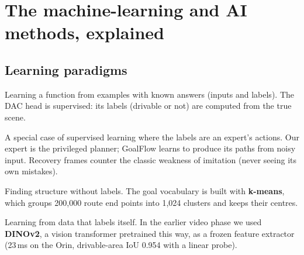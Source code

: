 \documentclass[11pt,a4paper]{article}
\begin{document}
\section{The machine-learning and AI methods, explained}
\label{sec:ml}

\subsection{Learning paradigms}
\begin{description}[style=nextline,leftmargin=0pt]
  \item[Supervised learning] Learning a function from examples with known answers (inputs and labels).
        The DAC head is supervised: its labels (drivable or not) are computed from the true scene.
  \item[Imitation learning / teacher--student] A special case of supervised learning where the labels are
        an expert's actions. Our expert is the privileged planner; GoalFlow learns to produce its paths from
        noisy input. Recovery frames counter the classic weakness of imitation (never seeing its own
        mistakes).
  \item[Unsupervised learning] Finding structure without labels. The goal vocabulary is built with
        \textbf{k-means}, which groups 200{,}000 route end points into 1{,}024 clusters and keeps their
        centres.
  \item[Self-supervised learning] Learning from data that labels itself. In the earlier video phase we used
        \textbf{DINOv2}, a vision transformer pretrained this way, as a frozen feature extractor (23\,ms on the
        Orin, drivable-area IoU 0.954 with a linear probe).
\end{description}
\end{document}
